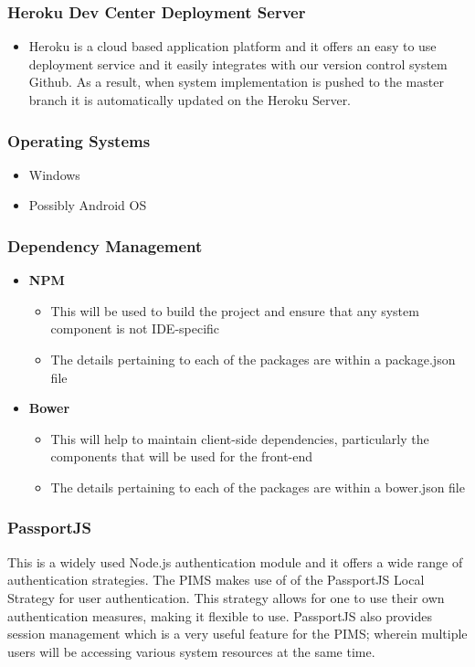 \subsubsection{Heroku Dev Center Deployment Server}
\begin{itemize}
	\item Heroku is a cloud based application platform and it offers an easy to use deployment service and it easily integrates with our version control system Github. As a result, when system implementation is pushed to the master branch it is automatically updated on the Heroku Server.
\end{itemize}


\subsubsection{Operating Systems}
\begin{itemize}
	\item Windows
	\item Possibly Android OS
\end{itemize}

\subsubsection{Dependency Management}
\begin{itemize}
	\item \textbf{NPM}
		\begin{itemize}
			\item This will be used to build the project and ensure that any system component is not IDE-specific
			\item The details pertaining to each of the packages are within a package.json file				
		\end{itemize}
	\item \textbf{Bower}
		\begin{itemize}
			\item This will help to maintain client-side dependencies, particularly the components that will be used for the front-end
			\item The details pertaining to each of the packages are within a bower.json file				
		\end{itemize}	
\end{itemize}

\subsubsection{PassportJS}
This is a widely used Node.js authentication module and it offers a wide range of authentication strategies. The PIMS makes use of of the PassportJS Local Strategy for user authentication. This strategy allows for one to use their own authentication measures, making it flexible to use. PassportJS also provides session management which is a very useful feature for the PIMS; wherein multiple users will be accessing various system resources at the same time.

